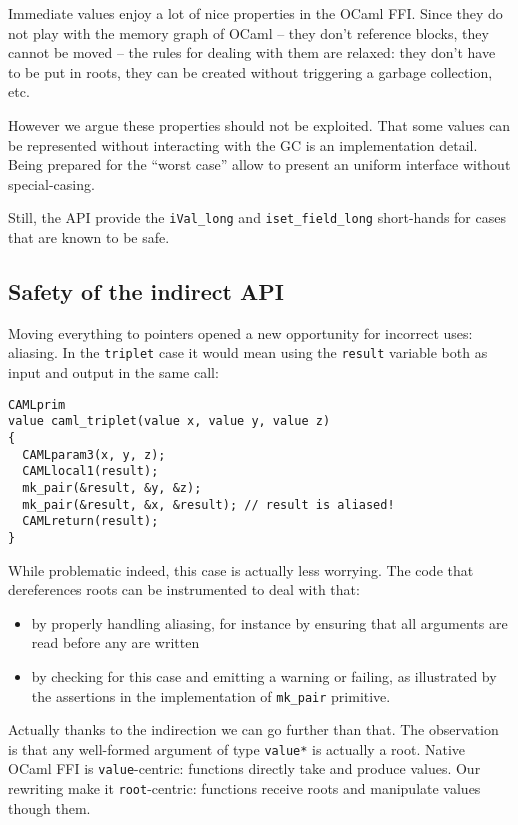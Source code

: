 \documentclass[a4paper]{easychair}
\begin{document}
Immediate values enjoy a lot of nice properties in the OCaml FFI. Since
they do not play with the memory graph of OCaml -- they don't reference
blocks, they cannot be moved -- the rules for dealing with them are
relaxed: they don't have to be put in roots, they can be created without
triggering a garbage collection, etc.

However we argue these properties should not be exploited. That some
values can be represented without interacting with the GC is an
implementation detail. Being prepared for the ``worst case'' allow to
present an uniform interface without special-casing.

Still, the API provide the \texttt{iVal\_long} and
\texttt{iset\_field\_long} short-hands for cases that are known to be
safe.

\subsection{Safety of the indirect API}

Moving everything to pointers opened a new opportunity for incorrect
uses: aliasing. In the \texttt{triplet} case it would mean using the
\texttt{result} variable both as input and output in the same call:

\begin{lstlisting}[]
CAMLprim
value caml_triplet(value x, value y, value z)
{
  CAMLparam3(x, y, z);
  CAMLlocal1(result);
  mk_pair(&result, &y, &z);
  mk_pair(&result, &x, &result); // result is aliased!
  CAMLreturn(result);
}
\end{lstlisting}

While problematic indeed, this case is actually less worrying. The code
that dereferences roots can be instrumented to deal with that:

\begin{itemize}
\item by properly handling aliasing, for instance by ensuring that all
      arguments are read before any are written
\item by checking for this case and emitting a warning or failing, as
      illustrated by the assertions in the implementation of
      \texttt{mk\_pair} primitive. 
\end{itemize}

Actually thanks to the indirection we can go further than that. The
observation is that any well-formed argument of type \texttt{value*} is
actually a root. Native OCaml FFI is \texttt{value}-centric: functions
directly take and produce values. Our rewriting make it
\texttt{root}-centric: functions receive roots and manipulate values
though them.
\end{document}
